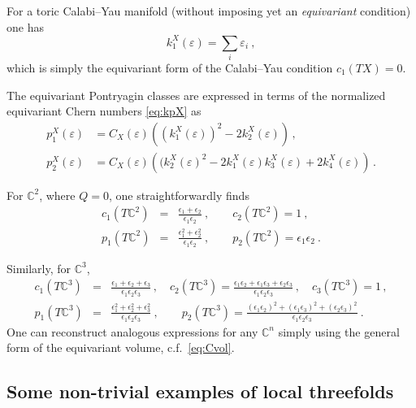 \documentclass[11pt,a4paper]{article}
\theoremstyle{definition}
\theoremstyle{identity}
\theoremstyle{remark}
\newcommand{\be}{\begin{equation}}
\newcommand{\ee}{\end{equation}}
\newcommand{\bea}{\begin{eqnarray}}
\newcommand{\eea}{\end{eqnarray}}
\newcommand{\e}{\epsilon}
\newcommand{\BC}{\mathbb{C}}
\begin{document}
For a toric Calabi--Yau manifold (without imposing yet an \emph{equivariant} condition) one has
\be
k_1^X(\varepsilon)
=
\sum_i\varepsilon_i\ ,
\ee
which is simply the equivariant form of the Calabi--Yau condition
$c_1(TX)=0$.

The equivariant Pontryagin classes are expressed in terms of the normalized equivariant Chern numbers \eqref{eq:kpX} as
\begin{equation}\label{eq:p12}
  \begin{aligned}  p_1^X(\varepsilon)&=C_X(\varepsilon)\left((k_1^X(\varepsilon))^2-2k_2^X(\varepsilon)\right)\,,\\
  p_2^X(\varepsilon)&=C_X(\varepsilon)\left((k_2^X(\varepsilon)^2-2k_1^X(\varepsilon)k_3^X(\varepsilon)+2k_4^X(\varepsilon)\right)\,.
\end{aligned}
\end{equation}




For
$\BC^2$, where $Q=0$,
one straightforwardly finds
\bea
c_1(T\BC^2)
&=&
\frac{\e_1+\e_2}{\e_1 \e_2}\ , \qquad
c_2(T\BC^2)
=
1\ ,
\\
p_1(T\BC^2)
&=&
\frac{\e_1^2+\e_2^2}{\e_1 \e_2}\ , \qquad
p_2(T\BC^2)
=
\e_1\e_2\ .
\eea

Similarly, for
$\BC^3$,
\bea
c_1(T\BC^3) &=& \frac{\e_1+\e_2+\e_3}{\e_1 \e_2 \e_3}\,, \quad c_2(T\BC^3) = \frac{\e_1\e_2 +\e_1\e_3 +\e_2\e_3}{\e_1 \e_2 \e_3}\,, \quad c_3(T\BC^3) = 1\,, \\
p_1(T\BC^3) &=& \frac{\e_1^2+\e_2^2+\e_3^2}{\e_1 \e_2 \e_3}\ , \qquad p_2(T\BC^3) = \frac{(\e_1\e_2)^2 +(\e_1\e_3)^2 +(\e_2\e_3)^2}{\e_1 \e_2 \e_3}\ .
\eea
One can reconstruct analogous expressions for any $\BC^n$ simply using the general form of the equivariant volume, c.f.\ \eqref{eq:Cvol}.

\subsection{Some non-trivial examples of local threefolds}
\label{app:A3}
\end{document}
